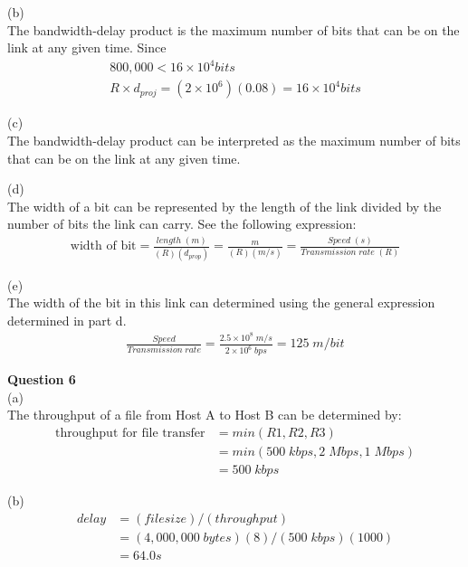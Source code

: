 \documentclass{article}
\begin{document}
(b)\\
The bandwidth-delay product is the maximum number of bits that can be on the link at any given time. Since
\begin{equation*}
    \begin{split}
    800,000 < 16 \times 10^4bits\\
    R \times d_{proj} = (2 \times 10^6) (0.08) = 16 \times 10^4bits
    \end{split}
\end{equation*}

(c)\\
The bandwidth-delay product can be interpreted as the maximum number of bits that can be on the link at any given time.

\bigskip
(d)\\
The width of a bit can be represented by the length of the link divided by the number of bits the link can carry. See the following expression:
\begin{equation*}
    \begin{split}
       \text{width of bit} = \frac{length \; (m)}{(R)(d_{prop})} = \frac{m}{(R)(m/s)} = \frac{Speed \; (s)}{Transmission \; rate \; (R)}
    \end{split}
\end{equation*}

(e)\\
The width of the bit in this link can determined using the general expression determined in part d.
\begin{equation*}
    \begin{split}
        \frac{Speed}{Transmission \; rate} = \frac{2.5 \times 10^8 \; m/s}{2 \times 10^6 \; bps} = 125 \; m/bit
    \end{split}
\end{equation*}

{\bf Question 6}\\
(a)\\
The throughput of a file from Host A to Host B can be determined by:
\begin{equation*}
    \begin{split}
        \text{throughput for file transfer} &= min(R1, R2, R3)\\
        &= min(500\;kbps, 2\;Mbps, 1\;Mbps)\\
        &= 500 \; kbps
    \end{split}
\end{equation*}

(b)\\
\begin{equation*}
    \begin{split}
        delay &= (file size)/(throughput)\\
        &= (4,000,000\;bytes)(8)/(500\;kbps)(1000)\\
        &= 64.0s
    \end{split}
\end{equation*}
\end{document}
